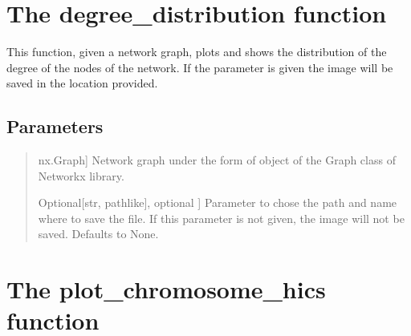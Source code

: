 \documentclass[letterpaper,10pt,english]{sphinxmanual}
\begin{document}
\section{The degree\_distribution function}
\label{\detokenize{index:the-degree-distribution-function}}

\begin{fulllineitems}
\label{\detokenize{index:hicanalysis.visualizegraph.degree_distribution}}
\pysigstartsignatures
{}
\pysigstopsignatures
\sphinxAtStartPar
This function, given a network graph, plots and shows the distribution of the degree of the nodes of the network.
If the parameter  is given the image will be saved in the location provided.


\subsection{Parameters}
\label{\detokenize{index:id14}}\begin{quote}
\begin{description}
\sphinxlineitem{network\_graph}{[}nx.Graph{]}
\sphinxAtStartPar
Network graph under the form of object of the Graph class of Networkx library.

\sphinxlineitem{savepath}{[}Optional{[}str, path\sphinxhyphen{}like{]}, optional {]}
\sphinxAtStartPar
Parameter to chose the path and name where to save the file. If this
parameter is not given, the image will not be saved. Defaults to None.

\end{description}
\end{quote}

\end{fulllineitems}



\section{The plot\_chromosome\_hics function}
\label{\detokenize{index:the-plot-chromosome-hics-function}}
\end{document}
